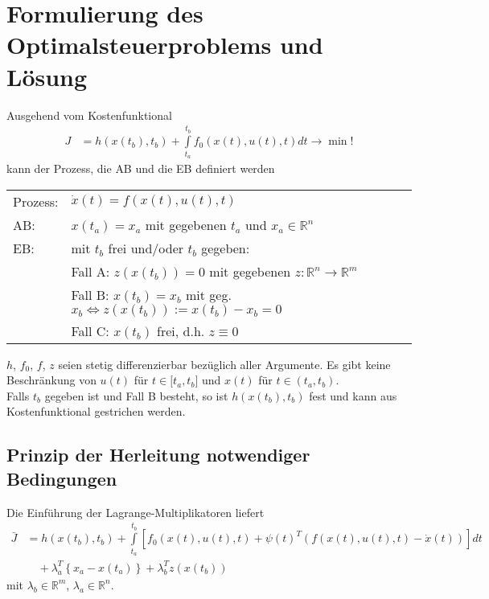 \section{Formulierung des Optimalsteuerproblems und Lösung}
Ausgehend vom Kostenfunktional
\begin{align*}
	J & = h\left(x(t_b),t_b \right) + \int\limits_{t_a}^{t_b}f_0\left(x(t),u(t),t \right)dt\rightarrow \min!
\end{align*}
kann der Prozess, die \ac{AB} und die \ac{EB} definiert werden\\
\begin{tabular}{ll}
Prozess: & $\dot{x}(t)=f\left(x(t),u(t),t \right)$\\
\ac{AB}: & $x(t_a)=x_a$ mit gegebenen $t_a$ und $x_a\in\mathbb{R}^n$\\
\ac{EB}: & mit $t_b$ frei und/oder $t_b$ gegeben:\\
		 & Fall A: $z\left(x(t_b) \right)=0$ mit gegebenen $z:\mathbb{R}^n\rightarrow\mathbb{R}^m$\\
		 & Fall B: $x(t_b)=x_b$ mit geg. $x_b\Leftrightarrow z(x(t_b)):=x(t_b)-x_b=0$\\
		 & Fall C: $x(t_b)$ frei, d.h. $z\equiv 0$ 
\end{tabular}

$h$, $f_0$, $f$, $z$ seien stetig differenzierbar bezüglich aller Argumente. Es gibt keine Beschränkung von $u(t)$ für $t\in \lbrack t_a, t_b \rbrack$ und $x(t)$ für $t\in\left(t_a, t_b
\right)$.\\
Falls $t_b$ gegeben ist und Fall B besteht, so ist $h(x(t_b),t_b)$ fest und kann aus Kostenfunktional gestrichen werden.

\subsection{Prinzip der Herleitung notwendiger Bedingungen}
\label{sec:kap_2_pr_herl_not_bed}
Die Einführung der Lagrange-Multiplikatoren liefert
\begin{align*}
	\bar{J} & = h\left(x(t_b),t_b \right)+\int\limits_{t_a}^{t_b}\left[f_0\left(x(t),u(t),t \right)+\psi(t)^T\left(f(x(t),u(t),t)-\dot{x}(t) \right)
	\right]dt\\
	& \quad + \lambda_a^T\left\{x_a - x(t_a) \right\} + \lambda_b^T z\left(x(t_b) \right)
\end{align*}
mit $\lambda_b\in\mathbb{R}^m$, $\lambda_a\in\mathbb{R}^n$.

